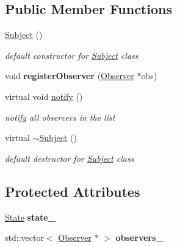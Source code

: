 \subsection*{Public Member Functions}
\begin{DoxyCompactItemize}
\item 
\hyperlink{classSubject_ab468044832c824c6d6c2f46272655207}{Subject} ()\hypertarget{classSubject_ab468044832c824c6d6c2f46272655207}{}\label{classSubject_ab468044832c824c6d6c2f46272655207}

\begin{DoxyCompactList}\small\item\em default constructor for \hyperlink{classSubject}{Subject} class \end{DoxyCompactList}\item 
void {\bfseries register\+Observer} (\hyperlink{classObserver}{Observer} $\ast$obs)\hypertarget{classSubject_a3cc2e9addd2f569314c76d4a2e636ca5}{}\label{classSubject_a3cc2e9addd2f569314c76d4a2e636ca5}

\item 
virtual void \hyperlink{classSubject_a40ac89e94c7bece9a39dda0d0cf6a943}{notify} ()\hypertarget{classSubject_a40ac89e94c7bece9a39dda0d0cf6a943}{}\label{classSubject_a40ac89e94c7bece9a39dda0d0cf6a943}

\begin{DoxyCompactList}\small\item\em notify all observers in the list \end{DoxyCompactList}\item 
virtual \hyperlink{classSubject_ae5980067d5ec5522db5a0d78100a34be}{$\sim$\+Subject} ()\hypertarget{classSubject_ae5980067d5ec5522db5a0d78100a34be}{}\label{classSubject_ae5980067d5ec5522db5a0d78100a34be}

\begin{DoxyCompactList}\small\item\em default destructor for \hyperlink{classSubject}{Subject} class \end{DoxyCompactList}\end{DoxyCompactItemize}
\subsection*{Protected Attributes}
\begin{DoxyCompactItemize}
\item 
\hyperlink{structState}{State} {\bfseries state\+\_\+}\hypertarget{classSubject_a417d57656e2ac83bfb8ad23bdd865dab}{}\label{classSubject_a417d57656e2ac83bfb8ad23bdd865dab}

\item 
std\+::vector$<$ \hyperlink{classObserver}{Observer} $\ast$ $>$ {\bfseries observers\+\_\+}\hypertarget{classSubject_a2534b894e46cb3ad3109c77a7834ae37}{}\label{classSubject_a2534b894e46cb3ad3109c77a7834ae37}

\end{DoxyCompactItemize}


